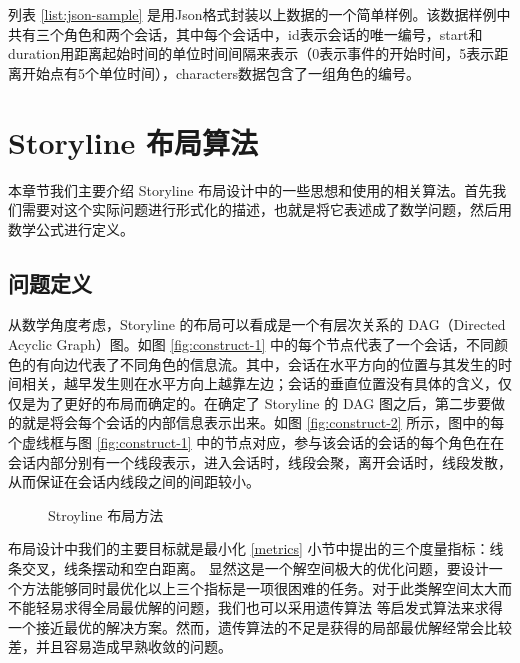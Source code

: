 列表 \ref{list:json-sample} 是用Json格式封装以上数据的一个简单样例。该数据样例中共有三个角色和两个会话，其中每个会话中，id表示会话的唯一编号，start和duration用距离起始时间的单位时间间隔来表示（0表示事件的开始时间，5表示距离开始点有5个单位时间），characters数据包含了一组角色的编号。

\section{Storyline 布局算法}
本章节我们主要介绍 Storyline 布局设计中的一些思想和使用的相关算法。首先我们需要对这个实际问题进行形式化的描述，也就是将它表述成了数学问题，然后用数学公式进行定义。
\subsection{问题定义}
\label{section:problem-definition}
 从数学角度考虑，Storyline 的布局可以看成是一个有层次关系的 DAG（Directed Acyclic Graph）图。如图 \ref{fig:construct-1} 中的每个节点代表了一个会话，不同颜色的有向边代表了不同角色的信息流。其中，会话在水平方向的位置与其发生的时间相关，越早发生则在水平方向上越靠左边；会话的垂直位置没有具体的含义，仅仅是为了更好的布局而确定的。在确定了 Storyline 的 DAG 图之后，第二步要做的就是将会每个会话的内部信息表示出来。如图 \ref{fig:construct-2} 所示，图中的每个虚线框与图 \ref{fig:construct-1} 中的节点对应，参与该会话的会话的每个角色在在会话内部分别有一个线段表示，进入会话时，线段会聚，离开会话时，线段发散，从而保证在会话内线段之间的间距较小。
\begin{figure}[htb]
    \centering
    \caption{Stroyline 布局方法}
    \label{fig:Storyline-dag}
\end{figure}

布局设计中我们的主要目标就是最小化 \ref{metrics} 小节中提出的三个度量指标：线条交叉，线条摆动和空白距离。 显然这是一个解空间极大的优化问题，要设计一个方法能够同时最优化以上三个指标是一项很困难的任务。对于此类解空间太大而不能轻易求得全局最优解的问题，我们也可以采用遗传算法\cite{tanahashi2012design} 等启发式算法来求得一个接近最优的解决方案。然而，遗传算法的不足是获得的局部最优解经常会比较差，并且容易造成早熟收敛的问题。

